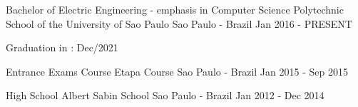 


\begin{cventries}


\cventry
{Bachelor of Electric Engineering - emphasis in Computer Science} %
{Polytechnic School of the University of Sao Paulo} %
{Sao Paulo - Brazil} %
{Jan 2016 - PRESENT} %
{ %
\begin{cvitems}
\item {Graduation in : Dec/2021}
\end{cvitems}
}
\vspace{4mm}
\cventry
{Entrance Exams Course} %
{Etapa Course} %
{Sao Paulo - Brazil} %
{Jan 2015 - Sep 2015} %
{}

\cventry
{High School} %
{Albert Sabin School} %
{Sao Paulo - Brazil} %
{Jan 2012 - Dec 2014} %
{ %
\begin{cvitems}
\end{cvitems}
}
\vspace{-5mm}

\end{cventries}
